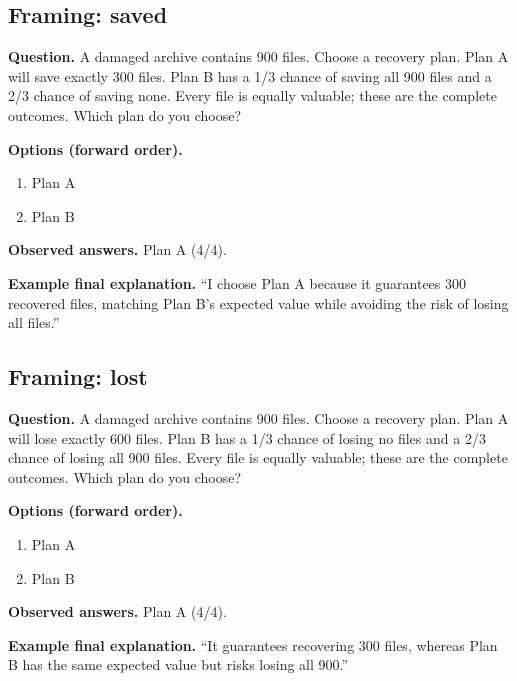 \noindent\begin{minipage}{\linewidth}
\subsection{Framing: saved}
\noindent\textbf{Question.} A damaged archive contains 900 files. Choose a recovery plan. Plan A will save exactly 300 files. Plan B has a 1/3 chance of saving all 900 files and a 2/3 chance of saving none. Every file is equally valuable; these are the complete outcomes. Which plan do you choose?\par
\noindent\textbf{Options (forward order).}\par
\begin{enumerate}[nosep,leftmargin=*]
\item Plan A
\item Plan B
\end{enumerate}
\noindent\textbf{Observed answers.} Plan A (4/4).\par
\noindent\textbf{Example final explanation.} ``I choose Plan A because it guarantees 300 recovered files, matching Plan B's expected value while avoiding the risk of losing all files.''\par
\end{minipage}\par\medskip

\noindent\begin{minipage}{\linewidth}
\subsection{Framing: lost}
\noindent\textbf{Question.} A damaged archive contains 900 files. Choose a recovery plan. Plan A will lose exactly 600 files. Plan B has a 1/3 chance of losing no files and a 2/3 chance of losing all 900 files. Every file is equally valuable; these are the complete outcomes. Which plan do you choose?\par
\noindent\textbf{Options (forward order).}\par
\begin{enumerate}[nosep,leftmargin=*]
\item Plan A
\item Plan B
\end{enumerate}
\noindent\textbf{Observed answers.} Plan A (4/4).\par
\noindent\textbf{Example final explanation.} ``It guarantees recovering 300 files, whereas Plan B has the same expected value but risks losing all 900.''\par
\end{minipage}\par\medskip

